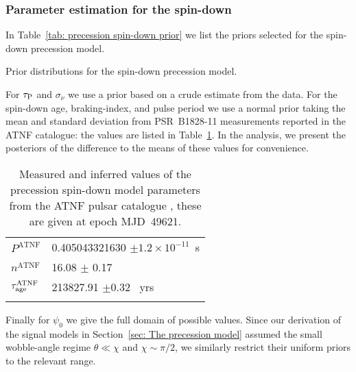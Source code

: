 \documentclass[../full_thesis/full_thesis.tex]{subfiles}
\newcommand{\thisdir}{../comparing_periodic_modulations}
\begin{document}
\subsubsection{Parameter estimation for the spin-down}

In Table~\ref{tab: precession spin-down prior} we list the priors selected for
the spin-down precession model.
\begin{table}
\centering
\caption{Prior distributions for the spin-down precession model.}
\label{tab: precession spin-down prior}

\end{table}
For $\tau_{\mathrm{P}}$ and
$\sigma_{\dot{\nu}}$ we use a prior based on a crude estimate from the data.
For the spin-down age, braking-index, and pulse period we use a normal prior
taking the mean and standard deviation from PSR~B1828-11 measurements reported in the
ATNF catalogue: the values are listed in Table~\ref{tab: ATNF}. In the analysis,
we present the posteriors of the difference to the means of these values for
convenience.
\begin{table}
\centering
\caption{Measured and inferred values of the precession spin-down model parameters
from the ATNF pulsar catalogue \citep{ATNF}, these are given at epoch MJD~49621.}
\label{tab: ATNF}
\begin{tabular}{ll} \hline \rule{0pt}{3ex}
$P^{\mathrm{ATNF}}$ & 0.405043321630 $\pm 1.2\times10^{-11}$~s \\
$n^{\mathrm{ATNF}}$ & 16.08 $\pm$ 0.17 \\
$\tau_{\mathrm{age}}^{\mathrm{ATNF}}$ & 213827.91 $\pm 0.32$~ yrs\\
 \hhline{==}
\end{tabular}
\end{table}
Finally for $\psi_0$ we give the full domain of
possible values. Since our derivation of the signal models in Section~\ref{sec:
The precession model} assumed the small wobble-angle regime $\theta \ll \chi$
and $\chi \sim \pi/2$, we similarly restrict their uniform priors to the
relevant range.
\end{document}
